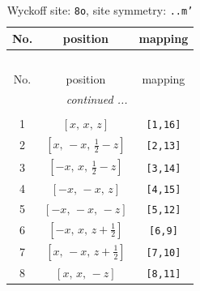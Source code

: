 \documentclass[fleqn,8pt]{jsarticle}
\begin{document}
\begin{longtable}{ccc}
\caption{Wyckoff site: {\tt 8o}, site symmetry: {\tt ..m'}}
 \\
 \hline \hline
No. & position & mapping \\ \hline \endfirsthead

\multicolumn{2}{l}{\tablename\ \thetable{}} \\
 \hline \hline
No. & position & mapping \\ \hline \endhead

 \hline \hline
\multicolumn{2}{r}{\footnotesize\it continued ...} \\ \endfoot

 \hline \hline
\multicolumn{2}{r}{} \\ \endlastfoot

1 & $\left[ x,\, x,\, z \right]$ & {\tt [1,16]} \\ \hline
2 & $\left[ x,\, - x,\, \frac{1}{2} - z \right]$ & {\tt [2,13]} \\ \hline
3 & $\left[ - x,\, x,\, \frac{1}{2} - z \right]$ & {\tt [3,14]} \\ \hline
4 & $\left[ - x,\, - x,\, z \right]$ & {\tt [4,15]} \\ \hline
5 & $\left[ - x,\, - x,\, - z \right]$ & {\tt [5,12]} \\ \hline
6 & $\left[ - x,\, x,\, z + \frac{1}{2} \right]$ & {\tt [6,9]} \\ \hline
7 & $\left[ x,\, - x,\, z + \frac{1}{2} \right]$ & {\tt [7,10]} \\ \hline
8 & $\left[ x,\, x,\, - z \right]$ & {\tt [8,11]} \\
\end{longtable}
\renewcommand{\arraystretch}{1.2}
\end{document}
